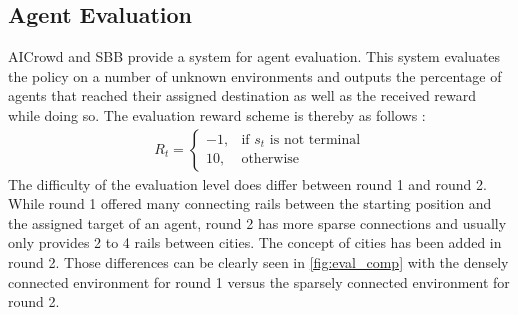 \subsection*{Agent Evaluation}\label{rl_agent_eval}
AICrowd and SBB provide a system for agent evaluation. This system evaluates the policy on a number of unknown environments and outputs the percentage of agents that reached their assigned destination as well as the received reward while doing so. The evaluation reward scheme is thereby as follows \cite{flatland_faq}:
\begin{gather*}
R_{t}= 
\begin{cases}
-1,				& \text{if } s_{t} \text{ is not terminal}\\
10,             & \text{otherwise}
\end{cases}
\end{gather*}
The difficulty of the evaluation level does differ between round 1 and round 2. While round 1 offered many connecting rails between the starting position and the assigned target of an agent, round 2 has more sparse connections and usually only provides 2 to 4 rails between cities. The concept of cities has been added in round 2. Those differences can be clearly seen in \autoref{fig:eval_comp} with the densely connected environment for round 1 versus the sparsely connected environment for round 2. 
